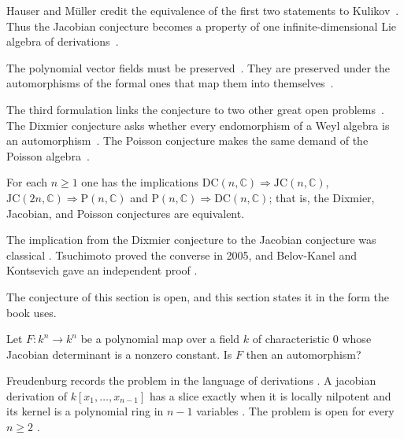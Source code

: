 Hauser and Müller credit the equivalence of the first two statements to
Kulikov~\cite[p.~211]{HauserMuller1998}. Thus the Jacobian conjecture becomes a
property of one infinite-dimensional Lie algebra of
derivations~\cite[Proposition~1, p.~211]{HauserMuller1998}.

The polynomial vector fields must be
preserved~\cite[Proposition~1, p.~211]{HauserMuller1998}. They are preserved
under the automorphisms of the formal ones that map them into
themselves~\cite[Proposition~1, p.~211]{HauserMuller1998}.

The third formulation links the conjecture to two other great open
problems~\cite[Theorem~4.4.1, p.~101]{VanEssenKurodaKoenig2021}. The Dixmier
conjecture asks whether every endomorphism of a Weyl algebra is an
automorphism~\cite[Theorem~4.4.1, p.~101]{VanEssenKurodaKoenig2021}. The
Poisson conjecture makes the same demand of the Poisson
algebra~\cite[Theorem~4.4.1, p.~101]{VanEssenKurodaKoenig2021}.

\begin{theorem}\label{thm:comm:dc-jc-p}
For each $n \ge 1$ one has the implications
$\mathrm{DC}(n,\mathbb{C}) \Rightarrow \mathrm{JC}(n,\mathbb{C})$,
$\mathrm{JC}(2n,\mathbb{C}) \Rightarrow \mathrm{P}(n,\mathbb{C})$ and
$\mathrm{P}(n,\mathbb{C}) \Rightarrow \mathrm{DC}(n,\mathbb{C})$; that is,
the Dixmier, Jacobian, and Poisson conjectures are equivalent.
\end{theorem}

The implication from the Dixmier conjecture to the Jacobian conjecture was
classical \cite[p.~91]{VanEssenKurodaKoenig2021}. Tsuchimoto proved the
converse in 2005, and Belov-Kanel and Kontsevich gave an independent proof
\cite[p.~91]{VanEssenKurodaKoenig2021}.

The conjecture of this section is open, and this section states it in the form
the book uses. %

\begin{problem}\label{prob:open:jc}
Let $F\colon k^n\to k^n$ be a polynomial map over a field $k$ of characteristic
$0$ whose Jacobian determinant is a nonzero constant.
Is $F$ then an automorphism?
\end{problem}

Freudenburg records the problem in the language of derivations
\cite[p.~81]{Freudenburg2017}. A jacobian derivation of $k[x_1,\dots,x_{n-1}]$
has a slice exactly when it is locally nilpotent and its kernel is a polynomial
ring in $n-1$ variables \cite[p.~81]{Freudenburg2017}. The problem is open for
every $n\ge2$ \cite[pp.~1--2]{BelovKanelKontsevich2007}.

